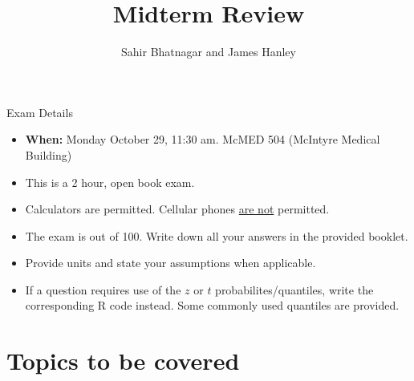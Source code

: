 \documentclass{beamer}\usepackage[]{graphicx}\usepackage[]{color}
\begin{document}




\title{Midterm Review}
\subtitle{}
\author{Sahir Bhatnagar and James Hanley}


\maketitle


\begin{frame}{Exam Details}

\begin{itemize}
		\setlength\itemsep{.51em}
			\item \textbf{When:} Monday October 29, 11:30 am. McMED 504 (McIntyre Medical Building)
	\item This is a 2 hour, open book exam. 
	\item Calculators are permitted. Cellular phones \underline{are not} permitted. 
	\item The exam is out of 100. Write down all your answers in the provided booklet. 
	\item Provide units and state your assumptions when applicable. 
	\item If a question requires use of the $z$ or $t$ probabilites/quantiles, write the corresponding R code instead. Some commonly used quantiles are provided. 

\end{itemize}

\end{frame}


\section{Topics to be covered}
\end{document}
